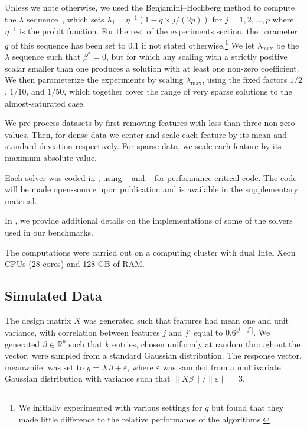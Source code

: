 Unless we note otherwise, we used the Benjamini--Hochberg method to compute the \(\lambda\) sequence~\parencite{bogdan2015},
which sets $\lambda_j = \eta^{-1}(1 - q\times j / (2p))$ for $j=1, 2, \hdots, p$ where $\eta^{-1}$ is the probit function.
For the rest of the experiments section, the parameter $q$ of this sequence has been set to $0.1$ if not stated otherwise.\footnote{We initially experimented with various settings for \(q\) but found that they made little difference to the relative performance of the algorithms.}
We let \(\lambda_\text{max}\) be the \(\lambda\) sequence such that \(\beta^* = 0\), but for which any scaling with a strictly positive scalar smaller than one produces a solution with at least one non-zero coefficient.
We then parameterize the experiments by scaling \(\lambda_\text{max}\), using the fixed factors \(1/2\), \(1/10\), and \(1/50\), which together cover the range of very sparse solutions to the almost-saturated case.

We pre-process datasets by first removing features with less than three non-zero values. Then, for dense data we center and scale each feature by its mean and standard deviation respectively.
For sparse data, we scale each feature by its maximum absolute value.

Each solver was coded in , using ~\parencite{harris2020} and ~\parencite{lam2015} for performance-critical code.
The code will be made open-source upon publication and is available in the supplementary material.

In , we provide additional details on the implementations of some of the solvers used in our benchmarks.

The computations were carried out on a computing cluster with dual Intel Xeon CPUs (28 cores) and 128 GB of RAM.

\subsection{Simulated Data}
\label{sec:experiments-real-data}

The design matrix $X$ was generated such that features had mean one and unit variance, with correlation between features $j$ and $j'$ equal to $0.6^{|j-j'|}$.
We generated \(\beta \in \mathbb{R}^p\) such that \(k\) entries, chosen uniformly at random throughout the vector, were sampled from a standard Gaussian distribution.
The response vector, meanwhile, was set to $y=X\beta + \varepsilon$, where
$\varepsilon$ was sampled from a multivariate Gaussian distribution with variance such that $\lVert X\beta\rVert / \lVert \varepsilon \rVert = 3$.

